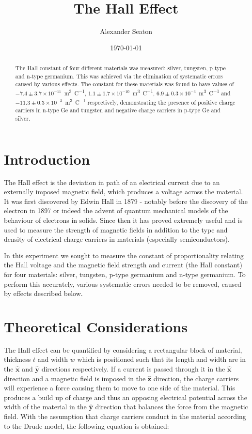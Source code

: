 \documentclass[a4paper]{article}
\title{The Hall Effect}
\date{\today}
\author{Alexander Seaton}
\newcommand{\supercite}[1]{\textsuperscript{\cite{#1}}}
\begin{document}
	\maketitle
	\begin{abstract}
		The Hall constant of four different materials was measured: silver, tungsten, p-type and n-type germanium. This was achieved via the elimination of systematic errors caused by various effects. The constant for these materials was found to have values of $-7.4\pm3.7\times 10^{-11}$\SI{}{\cubic\metre\per\coulomb}, $1.1\pm1.7\times 10^{-10}$\SI{}{\cubic\metre\per\coulomb}, $6.9\pm0.3\times 10^{-3}$\SI{}{\cubic\metre\per\coulomb} and $-11.3\pm0.3\times 10^{-3}$\SI{}{\cubic\metre\per\coulomb} respectively, demonstrating the presence of positive charge carriers in n-type Ge and tungsten and negative charge carriers in p-type Ge and silver.
	\end{abstract}
	
	
	\section{Introduction}
		The Hall effect is the deviation in path of an electrical current due to an externally imposed magnetic field, which produces a voltage across the material. It was first discovered by Edwin Hall in 1879\supercite{hallPaper} - notably before the discovery of the electron in 1897 or indeed the advent of quantum mechanical models of the behaviour of electrons in solids. Since then it has proved extremely useful and is used to measure the strength of magnetic fields in addition to the type and density of electrical charge carriers in materials (especially semiconductors).
		
		In this experiment we sought to measure the constant of proportionality relating the Hall voltage and the magnetic field strength and current (the Hall constant) for four materials: silver, tungsten, p-type germanium and n-type germanium. To perform this accurately, various systematic errors needed to be removed, caused by effects described below.
		
	\section{Theoretical Considerations}
		The Hall effect can be quantified by considering a rectangular block of material, thickness $t$ and width $w$ which is positioned such that its length and width are in the $\hat{\mathbf{x}}$ and $\hat{\mathbf{y}}$ directions respectively. If a current is passed through it in the $\hat{\mathbf{x}}$ direction and a magnetic field is imposed in the $\hat{\mathbf{z}}$ direction, the charge carriers will experience a force causing them to move to one side of the material. This produces a build up of charge and thus an opposing electrical potential across the width of the material in the $\hat{\mathbf{y}}$ direction that balances the force from the magnetic field. With the assumption that charge carriers conduct in the material according to the Drude model, the following equation is obtained:
		
\end{document}
